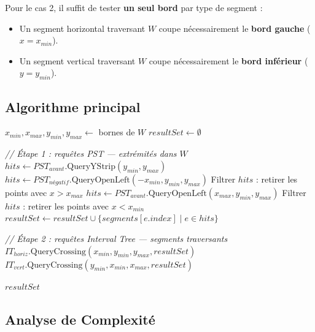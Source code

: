 \documentclass[11pt,a4paper]{article}
\begin{document}
Pour le cas 2, il suffit de tester \textbf{un seul bord} par type de segment :
\begin{itemize}
    \item Un segment horizontal traversant $W$ coupe nécessairement le \textbf{bord gauche} ($x = x_{min}$).
    \item Un segment vertical traversant $W$ coupe nécessairement le \textbf{bord inférieur} ($y = y_{min}$).
\end{itemize}

\subsection{Algorithme principal}

\begin{algorithm}[H]
\caption{Algorithme de fenêtrage complet}
\begin{algorithmic}[1]
    \State $x_{min}, x_{max}, y_{min}, y_{max} \gets$ bornes de $W$
    \State $resultSet \gets \emptyset$ 

    \State \textit{// Étape 1 : requêtes PST — extrémités dans $W$}
        \State $hits \gets PST_{avant}.\text{QueryYStrip}(y_{min}, y_{max})$
        \State $hits \gets PST_{négatif}.\text{QueryOpenLeft}(-x_{min}, y_{min}, y_{max})$
        \State Filtrer $hits$ : retirer les points avec $x > x_{max}$
    \Else
        \State $hits \gets PST_{avant}.\text{QueryOpenLeft}(x_{max}, y_{min}, y_{max})$
         Filtrer $hits$ : retirer les points avec $x < x_{min}$ \EndIf
    \EndIf
    \State $resultSet \gets resultSet \cup \{ segments[e.index] \mid e \in hits \}$

    \State \textit{// Étape 2 : requêtes Interval Tree — segments traversants}
        \State $IT_{horiz}.\text{QueryCrossing}(x_{min}, y_{min}, y_{max}, resultSet)$
    \EndIf
        \State $IT_{vert}.\text{QueryCrossing}(y_{min}, x_{min}, x_{max}, resultSet)$
    \EndIf

    \State \Return $resultSet$
\EndProcedure
\end{algorithmic}
\end{algorithm}

\subsection{Analyse de Complexité}
\end{document}
